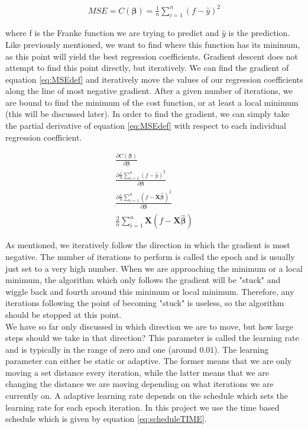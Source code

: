 \documentclass[12pt,a4paper]{article}
\begin{document}
\begin{equation}\label{eq:MSEdef}
\begin{aligned}
MSE = C(\boldsymbol{\beta}) = \frac{1}{n}\sum_{i = 1}^n (f - \hat{y})^2
\end{aligned}
\end{equation}

\noindent where f is the Franke function we are trying to predict and $\hat{y}$ is the prediction. Like previously mentioned, we want to find where this function has its minimum, as this point will yield the best regression coefficients. Gradient descent does not attempt to find this point directly, but iteratively. We can find the gradient of equation \ref{eq:MSEdef} and iteratively move the values of our regression coefficients along the line of most negative gradient. After a given number of iterations, we are bound to find the minimum of the cost function, or at least a local minimum (this will be discussed later). In order to find the gradient, we can simply take the partial derivative of equation \ref{eq:MSEdef} with respect to each individual regression coefficient.

\begin{equation}\label{eq:MSEder}
\begin{aligned}
\frac{\partial C(\boldsymbol{\beta})}{\partial \boldsymbol{\beta}} 
\\
\frac{\partial \frac{1}{n} \sum_{i = 1}^n (f-\hat{y})^2}{\partial \boldsymbol{\beta}} 
\\
\frac{\partial \frac{1}{n} \sum_{i = 1}^n (f-\textbf{X}\boldsymbol{\hat{\beta}})^2}{\partial \boldsymbol{\beta}} 
\\
\frac{2}{n} \sum_{i = 1}^n \textbf{X}(f - \textbf{X}\boldsymbol{\hat{\beta}}) 
\end{aligned}
\end{equation}

\noindent As mentioned, we iteratively follow the direction in which the gradient is most negative. The number of iterations to perform is called the epoch and is usually just set to a very high number. When we are approaching the minimum or a local minimum, the algorithm which only follows the gradient will be "stuck" and wiggle back and fourth around this minimum or local minimum. Therefore, any iterations following the point of becoming "stuck" is useless, so the algorithm should be stopped at this point.
\\
We have so far only discussed in which direction we are to move, but how large steps should we take in that direction? This parameter is called the learning rate and is typically in the range of zero and one (around $0.01$). The learning parameter can either be static or adaptive. The former means that we are only moving a set distance every iteration, while the latter means that we are changing the distance we are moving depending on what iterations we are currently on. A adaptive learning rate depends on the schedule which sets the learning rate for each epoch iteration. In this project we use the time based schedule which is given by equation \ref{eq:scheduleTIME}.
\end{document}
